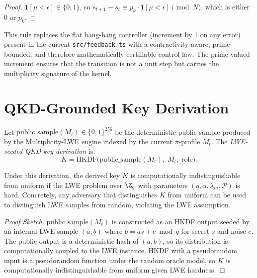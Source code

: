 \documentclass[11pt]{article}
\begin{document}
\begin{proof}
$\mathbf{1}[\mu<\epsilon]\in\{0,1\}$, so
$s_{t+1}-s_t \equiv p_k\cdot\mathbf{1}[\mu<\epsilon] \pmod{N}$,
which is either $0$ or $p_k$.
\end{proof}

\begin{remark}
This rule replaces the flat bang-bang controller (increment by 1 on any
error) present in the current \texttt{src/feedback.ts} with a
contractivity-aware, prime-bounded, and therefore mathematically certifiable
control law.  The prime-valued increment ensures that the transition is not
a unit step but carries the multiplicity signature of the kernel.
\end{remark}

\section{QKD-Grounded Key Derivation}

\begin{definition}
Let $\mathrm{public\_sample}(M_t)\in\{0,1\}^{256}$ be the deterministic
public sample produced by the Multiplicity-LWE engine indexed by the current
$\pi$-profile $M_t$.  The \emph{LWE-seeded QKD key derivation} is:
\[
  K = \mathrm{HKDF}\!\bigl(\mathrm{public\_sample}(M_t),\; M_t,\; \mathrm{role}\bigr).
\]
\end{definition}

\begin{proposition}
Under this derivation, the derived key $K$ is computationally indistinguishable
from uniform if the LWE problem over $\Z_q$ with parameters
$(q, \alpha, \lambda_m, \mathcal{P})$ is hard.  Concretely, any adversary
that distinguishes $K$ from uniform can be used to distinguish LWE samples
from random, violating the LWE assumption.
\end{proposition}

\begin{proof}[Proof Sketch]
$\mathrm{public\_sample}(M_t)$ is constructed as an HKDF output seeded by
an internal LWE sample $(a,b)$ where $b = as + e \bmod q$ for secret $s$
and noise $e$.  The public output is a deterministic hash of $(a,b)$, so
its distribution is computationally coupled to the LWE instance.  HKDF with
a pseudorandom input is a pseudorandom function under the random oracle model,
so $K$ is computationally indistinguishable from uniform given LWE hardness.
\end{proof}
\end{document}
